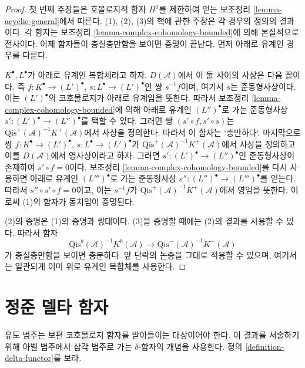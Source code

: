 \begin{proof}
첫 번째 주장들은 호몰로지적 함자 $H^0$를 제한하여 얻는 보조정리
\ref{lemma-acyclic-general}에서 따른다. (1), (2), (3)의 핵에 관한
주장은 각 경우의 정의의 결과이다.
각 함자는 보조정리 \ref{lemma-complex-cohomology-bounded}에 의해
본질적으로 전사이다. 이제 함자들이 충실충만함을 보이면 증명이 끝난다.
먼저 아래로 유계인 경우를 다룬다.

\medskip\noindent
$K^\bullet, L^\bullet$가 아래로 유계인 복합체라고 하자.
$D(\mathcal{A})$에서 이 둘 사이의 사상은 다음 꼴이다. 즉
$f : K^\bullet \to (L')^\bullet$, $s : L^\bullet \to (L')^\bullet$인
쌍 $s^{-1}f$이며, 여기서 $s$는 준동형사상이다. 이는 $(L')^\bullet$의
코호몰로지가 아래로 유계임을 뜻한다. 따라서 보조정리
\ref{lemma-complex-cohomology-bounded}에 의해 아래로 유계인
$(L'')^\bullet$로 가는 준동형사상
$s' : (L')^\bullet \to (L'')^\bullet$를 택할 수 있다. 그러면 쌍
$(s' \circ f, s' \circ s)$는
$\text{Qis}^{+}(\mathcal{A})^{-1}K^{+}(\mathcal{A})$에서 사상을 정의한다.
따라서 이 함자는 {`}충만하다{`}. 마지막으로 쌍
$f : K^\bullet \to (L')^\bullet$, $s : L^\bullet \to (L')^\bullet$가
$\text{Qis}^{+}(\mathcal{A})^{-1}K^{+}(\mathcal{A})$에서 사상을 정의하고
이를 $D(\mathcal{A})$에서 영사상이라고 하자. 그러면
$s' : (L')^\bullet \to (L'')^\bullet$인 준동형사상이 존재하여
$s' \circ f = 0$이다. 보조정리
\ref{lemma-complex-cohomology-bounded}를 다시 사용하면 아래로 유계인
$(L''')^\bullet$로 가는 준동형사상
$s'' : (L'')^\bullet \to (L''')^\bullet$를 얻는다. 따라서
$s'' \circ s' \circ f = 0$이고, 이는
$s^{-1}f$가 $\text{Qis}^{+}(\mathcal{A})^{-1}K^{+}(\mathcal{A})$에서
영임을 뜻한다. 이로써 (1)의 함자가 동치임이 증명된다.

\medskip\noindent
(2)의 증명은 (1)의 증명과 쌍대이다. (3)을 증명할 때에는 (2)의 결과를
사용할 수 있다. 따라서 함자
$$
\text{Qis}^b(\mathcal{A})^{-1}K^b(\mathcal{A})
\to \text{Qis}^{-}(\mathcal{A})^{-1}K^{-}(\mathcal{A})
$$
가 충실충만함을 보이면 충분하다. 앞 단락의 논증을 그대로 적용할 수
있으며, 여기서는 일관되게 이미 위로 유계인 복합체를 사용한다.
\end{proof}

\section{정준 델타 함자}
\label{section-canonical-delta-functor}

\noindent
유도 범주는 보편 코호몰로지 함자를 받아들이는 대상이어야 한다. 이 결과를
서술하기 위해 아벨 범주에서 삼각 범주로 가는 $\delta$-함자의 개념을
사용한다. 정의 \ref{definition-delta-functor}를 보라.

